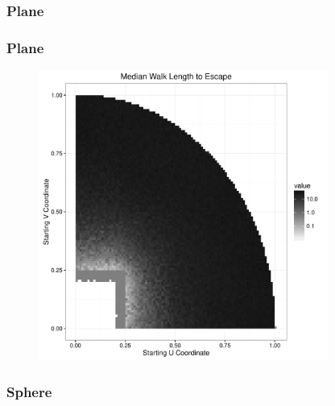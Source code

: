 \documentclass{beamer}
\begin{document}


\begin{frame}
	
	\frametitle{Plane}
	
	\begin{figure}
		
	\end{figure}
	
\end{frame}

\begin{frame}
	
	\frametitle{Plane}
	
	\begin{figure}
		\includegraphics[width=0.85\textwidth]{images/PlaneCircleL05.pdf}
	\end{figure}
	
\end{frame}



\begin{frame}
	
	\frametitle{Sphere}
	
	\begin{figure}
		
	\end{figure}
	
\end{frame}
\end{document}
